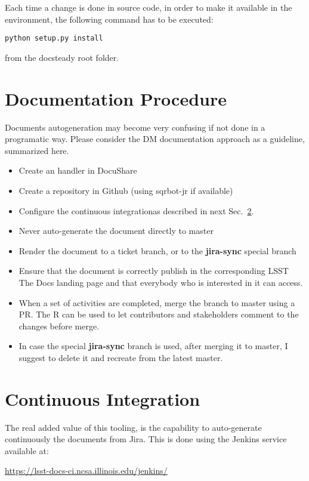 \documentclass[DM]{lsstdoc}
\begin{document}
Each time a change is done in source code, in order to make it available in the environment, the following command has to be executed:

\texttt{python setup.py install}

from the docsteady root folder.


\section{Documentation Procedure}
\label{sec:docproc}

Documents autogeneration may become very confusing if not done in a programatic way.
Please consider the DM documentation approach as a guideline, summarized here.

\begin{itemize}
\item Create an handler in DocuShare
\item Create a repository in Github (using sqrbot-jr if available)
\item Configure the continuous integrationas described in next Sec.~\ref{sec:ci}.
\item Never auto-generate the document directly to master
\item Render the document to a ticket branch, or to the \textbf{jira-sync} special branch
\item Ensure that the document is correctly publish in the corresponding LSST The Docs landing page and that everybody who is interested in it can access.
\item When a set of activities are completed, merge the branch to master using a PR. The R can be used to let contributors and stakeholders comment to the changes before merge.
\item In case the special \textbf{jira-sync} branch is used, after merging it to master, I suggest to delete it  and recreate from the latest master.
\end{itemize}



\section{Continuous Integration}\label{sec:ci}

The real added value of this tooling, is the capability to auto-generate continuously the documents from Jira.
This is done using the Jenkins service available at:

\url{https://lsst-docs-ci.ncsa.illinois.edu/jenkins/}
\end{document}
